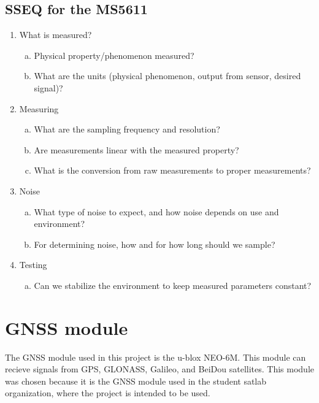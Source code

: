 \subsection{SSEQ for the MS5611}
\begin{enumerate}
\item What is measured?
    \begin{enumerate}[(a)]
        \item Physical property/phenomenon measured?
        \item What are the units (physical phenomenon, output from sensor, desired signal)?
    \end{enumerate}

\item Measuring
    \begin{enumerate}[(a)]
        \item What are the sampling frequency and resolution?
        \item Are measurements linear with the measured property?
        \item What is the conversion from raw measurements to proper measurements?
    \end{enumerate}
\item Noise
    \begin{enumerate}[(a)]
        \item What type of noise to expect, and how noise depends on use and environment?
        \item For determining noise, how and for how long should we sample?
    \end{enumerate}
\item Testing
    \begin{enumerate}[(a)]
        \item Can we stabilize the environment to keep measured parameters constant?
    \end{enumerate}
\end{enumerate}

\section{GNSS module }\label{sec:gnss-module}
The GNSS module used in this project is the u-blox NEO-6M. 
This module can recieve signals from GPS, GLONASS, Galileo, and BeiDou satellites. 
This module was chosen because it is the GNSS module used in the student satlab organization, where the project is intended to be used.

